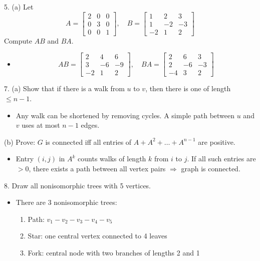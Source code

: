 \documentclass[12pt]{article}
\begin{document}
	5. (a) Let 
	\[
	A = \begin{bmatrix}2 & 0 & 0 \\ 0 & 3 & 0 \\ 0 & 0 & 1\end{bmatrix}, \quad
	B = \begin{bmatrix}1 & 2 & 3 \\ 1 & -2 & -3 \\ -2 & 1 & 2\end{bmatrix}
	\]
	Compute $AB$ and $BA$.
	\begin{itemize}
		\item
		\[
		AB = \begin{bmatrix}2 & 4 & 6 \\ 3 & -6 & -9 \\ -2 & 1 & 2\end{bmatrix}, \quad
		BA = \begin{bmatrix}2 & 6 & 3 \\ 2 & -6 & -3 \\ -4 & 3 & 2\end{bmatrix}
		\]
	\end{itemize}
	
	
	7. (a) Show that if there is a walk from $u$ to $v$, then there is one of length $\le n - 1$.
	\begin{itemize}
		\item Any walk can be shortened by removing cycles. A simple path between $u$ and $v$ uses at most $n - 1$ edges.
	\end{itemize}
	(b) Prove: $G$ is connected iff all entries of $A + A^2 + \dots + A^{n-1}$ are positive.
	\begin{itemize}
		\item Entry $(i,j)$ in $A^k$ counts walks of length $k$ from $i$ to $j$. If all such entries are $>0$, there exists a path between all vertex pairs $\Rightarrow$ graph is connected.
	\end{itemize}
	
	8. Draw all nonisomorphic trees with 5 vertices.
	\begin{itemize}
		\item There are 3 nonisomorphic trees:
		\begin{enumerate}[label=\alph*)]
			\item Path: $v_1 - v_2 - v_3 - v_4 - v_5$
			\item Star: one central vertex connected to 4 leaves
			\item Fork: central node with two branches of lengths 2 and 1
		\end{enumerate}
	\end{itemize}
	
\end{document}
